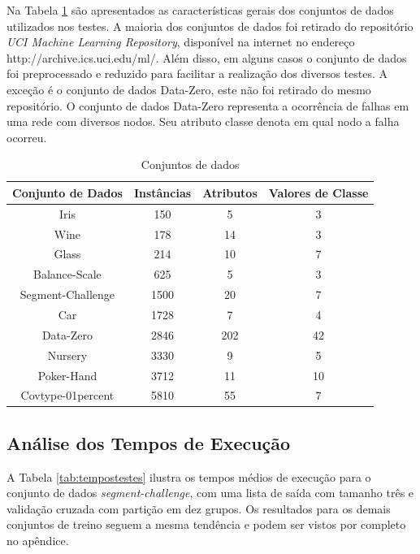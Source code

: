 Na Tabela \ref{tab:datasets} são apresentados as características gerais dos conjuntos de dados utilizados nos testes.
A maioria dos conjuntos de dados foi retirado do repositório \textit{UCI Machine Learning Repository}, disponível na internet no endereço http://archive.ics.uci.edu/ml/.
Além disso, em alguns casos o conjunto de dados foi preprocessado e reduzido para facilitar a realização dos diversos testes.
A exceção é o conjunto de dados Data-Zero, este não foi retirado do mesmo repositório.
O conjunto de dados Data-Zero representa a ocorrência de falhas em uma rede com diversos nodos.
Seu atributo classe denota em qual nodo a falha ocorreu.

\begin{table}[h!]
  \begin{center}
    \begin{tabular}{cccc}
      \hline
      \textbf{Conjunto de Dados} & \textbf{Instâncias} & \textbf{Atributos} & \textbf{Valores de Classe} \\
      \hline

      Iris & 150 & 5 & 3 \\
      Wine & 178 & 14 & 3 \\ 
      Glass & 214 & 10 & 7 \\
      Balance-Scale & 625 & 5 & 3 \\
      Segment-Challenge & 1500 & 20 & 7 \\
      Car & 1728 & 7 & 4 \\
      Data-Zero & 2846 & 202 & 42 \\
      Nursery & 3330 & 9 & 5 \\
      Poker-Hand & 3712 & 11 & 10 \\      
      Covtype-01percent & 5810 & 55 & 7 \\

      \hline
    \end{tabular}
    \caption{Conjuntos de dados}
    \label{tab:datasets}
  \end{center}
\end{table}

\subsection{Análise dos Tempos de Execução}

A Tabela \ref{tab:tempostestes} ilustra os tempos médios de execução para o conjunto de dados \textit{segment-challenge}, com uma lista de saída com tamanho três e validação cruzada com partição em dez grupos.
Os resultados para os demais conjuntos de treino seguem a mesma tendência e podem ser vistos por completo no apêndice.

